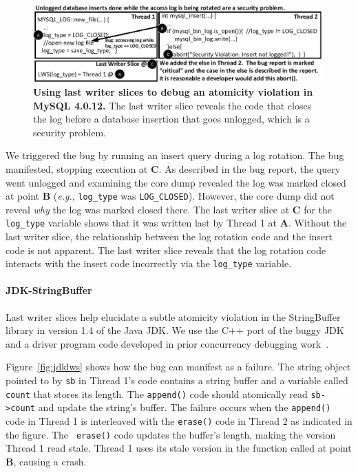 \documentclass[preprint,9pt]{sigplanconf}
\begin{document}
\begin{figure}[h]
\centering
\includegraphics[width=\columnwidth]{figs/MySQLDebug.pdf}
\caption{\label{fig:mysqllws}{\bf Using last writer slices to debug an
atomicity violation in MySQL 4.0.12.} The last writer slice reveals the code that closes the log before a database insertion that goes unlogged, which is a security problem.}
\end{figure}

We triggered the bug by running an insert query during a log rotation.  The bug
manifested, stopping execution at {\bf C}.  As described in the bug report, the
query went unlogged and examining the core dump revealed the log was marked
closed at point {\bf B} ({\em e.g.}, {\tt log\_type} was {\tt LOG\_CLOSED}).
However, the core dump did not reveal {\em why} the log was marked closed
there.  The last writer slice at {\bf C} for the {\tt log\_type} variable shows
that it was written last by Thread 1 at {\bf A}.  Without the last writer
slice, the relationship between the log rotation code and the insert code is
not apparent. The last writer slice reveals that the log rotation code
interacts with the insert code incorrectly via the {\tt log\_type} variable.  


\paragraph{JDK-StringBuffer}

Last writer slices help elucidate a subtle atomicity violation in the
StringBuffer library in version 1.4 of the Java JDK.  We use the C++ port of
the buggy JDK and a driver program code developed in prior concurrency debugging
work~\cite{concurrencybugs}.  


Figure~\ref{fig:jdklws} shows how the bug can manifest as a failure. The string
object pointed to by {\tt sb} in Thread 1's code contains a string buffer and a
variable called {\tt count} that stores its length.  The {\tt append()}
code should atomically read {\tt sb->count} and update the string's buffer.
The failure occurs when the {\tt append()} code in Thread 1 is interleaved with
the {\tt erase()} code in Thread 2 as indicated in the figure.  The {\tt
erase()} code updates the buffer's length, making the version Thread 1 read
stale.  Thread 1 uses its stale version in the function called at point {\bf
B}, causing a crash.  
\end{document}
